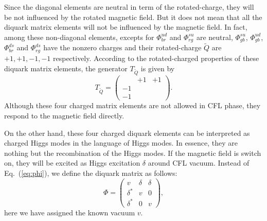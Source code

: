 \documentclass[12pt]{article}
\begin{document}
Since the diagonal elements are neutral in term of the rotated-charge,
they will be not influenced by the rotated magnetic field.
But it does not mean that all the diquark matrix elements will not be influenced by the magnetic field.
In fact, among these non-diagonal
elements, excepts for $\Phi_{br}^{ud}$ and $\Phi_{rg}^{su}$ are neutral,  $\Phi_{gb}^{su}$, $\Phi_{gb}^{ud}$, $\Phi_{br}^{ds}$ and $\Phi_{rg}^{ds}$ have the
nonzero charges and their rotated-charge $\widetilde{Q}$ are $+1,+1,-1,-1$  respectively.
According to the rotated-charged properties of these diquark matrix elements,
 the generator $T_{\widetilde{Q}}$ is given by 
\begin{equation}
T_{\widetilde{Q}} = \begin{pmatrix}
            &    +1  & +1\\
    -1 &            &      \\
    -1 &            &
\end{pmatrix}.
\end{equation}
Although these four charged matrix elements are not allowed in CFL phase,
they respond to the magnetic field directly.


On the other hand, these four charged diquark elements can be interpreted as charged Higgs modes
in the language of Higgs modes.
In essence, they are nothing but the recombination of the Higgs modes.
If the magnetic field is switch on, they will be excited as Higgs excitation $\delta$ around CFL vacuum.
Instead of Eq.~(\ref{eq:phi}),
we define the diquark matrix  as follows:
\begin{equation}
  \label{eq:diquarkmatrix0}
\Phi = \begin{pmatrix} v & \delta & \delta \\ \delta^* &  v & 0 \\ \delta^* & 0 & v\end{pmatrix},
\end{equation}
here we have assigned the known vacuum $v$.
\end{document}
